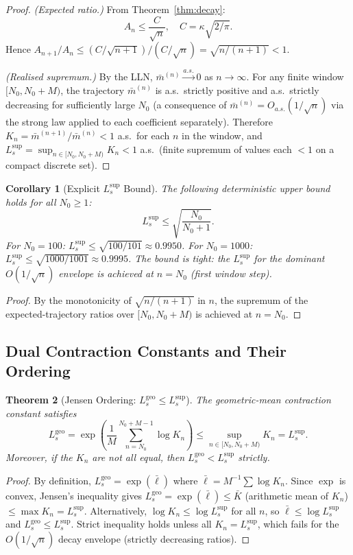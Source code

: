 \documentclass[12pt,letterpaper]{article}
\theoremstyle{definition}
\theoremstyle{plain}
\newtheorem{theorem}{Theorem}[section]
\newtheorem{corollary}[theorem]{Corollary}
\theoremstyle{remark}
\newcommand{\mbar}{\bar{m}}
\newcommand{\Lsup}{L_s^{\sup}}
\newcommand{\Lgeo}{L_s^{\mathrm{geo}}}
\begin{document}
\begin{proof}
\textit{(Expected ratio.)}  From Theorem~\ref{thm:decay}:
\[
  A_n \le \frac{C}{\sqrt{n}}, \quad C = \kappa\sqrt{2/\pi}.
\]
Hence $A_{n+1}/A_n \le (C/\sqrt{n+1})/(C/\sqrt{n}) = \sqrt{n/(n+1)} < 1$.

\textit{(Realised supremum.)}
By the LLN, $\mbar^{(n)} \xrightarrow{a.s.} 0$ as $n\to\infty$.
For any finite window $[N_0, N_0+M)$, the trajectory $\mbar^{(n)}$ is
a.s.\ strictly positive and a.s.\ strictly decreasing for sufficiently
large $N_0$ (a consequence of $\mbar^{(n)} = O_{a.s.}(1/\sqrt{n})$ via
the strong law applied to each coefficient separately).  Therefore
$K_n = \mbar^{(n+1)}/\mbar^{(n)} < 1$ a.s.\ for each $n$ in the window,
and $\Lsup = \sup_{n \in [N_0,N_0+M)} K_n < 1$ a.s.\ (finite supremum
of values each $< 1$ on a compact discrete set).
\end{proof}

\begin{corollary}[Explicit $\Lsup$ Bound]
\label{cor:lsup-bound}
The following deterministic upper bound holds for all $N_0 \ge 1$:
\[
  \Lsup \le \sqrt{\frac{N_0}{N_0+1}}.
\]
For $N_0 = 100$: $\Lsup \le \sqrt{100/101} \approx 0.9950$.
For $N_0 = 1000$: $\Lsup \le \sqrt{1000/1001} \approx 0.9995$.
The bound is tight: the $\Lsup$ for the dominant $O(1/\sqrt{n})$ envelope
is achieved at $n = N_0$ (first window step).
\end{corollary}

\begin{proof}
By the monotonicity of $\sqrt{n/(n+1)}$ in $n$, the supremum of the
expected-trajectory ratios over $[N_0, N_0+M)$ is achieved at $n=N_0$.
\end{proof}

\subsection{Dual Contraction Constants and Their Ordering}

\begin{theorem}[Jensen Ordering: $\Lgeo \le \Lsup$]
\label{thm:jensen}
The geometric-mean contraction constant satisfies
\[
  \Lgeo
  = \exp\!\left(\frac{1}{M}\sum_{n=N_0}^{N_0+M-1}\log K_n\right)
  \le \sup_{n\in[N_0,N_0+M)} K_n
  = \Lsup.
\]
Moreover, if the $K_n$ are not all equal, then $\Lgeo < \Lsup$ strictly.
\end{theorem}

\begin{proof}
By definition, $\Lgeo = \exp(\bar{\ell})$ where $\bar\ell = M^{-1}\sum \log K_n$.
Since $\exp$ is convex, Jensen's inequality gives
$\Lgeo = \exp(\bar\ell) \le \bar{K}$ (arithmetic mean of $K_n$)
$\le \max K_n = \Lsup$.
Alternatively, $\log K_n \le \log\Lsup$ for all $n$, so
$\bar\ell \le \log\Lsup$ and $\Lgeo \le \Lsup$.
Strict inequality holds unless all $K_n = \Lsup$, which fails for
the $O(1/\sqrt{n})$ decay envelope (strictly decreasing ratios).
\end{proof}
\end{document}
